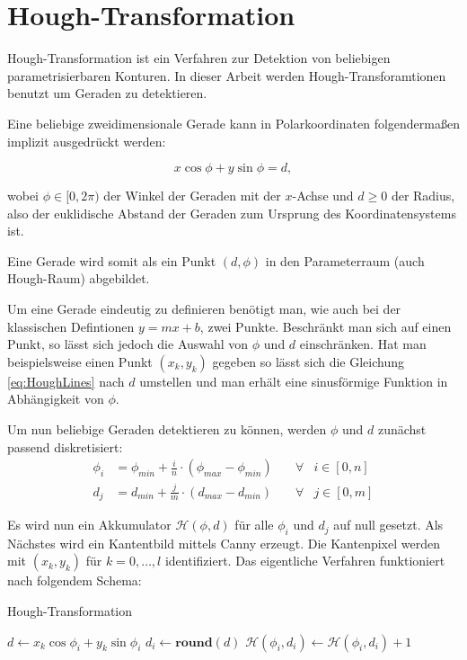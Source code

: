 \section{Hough-Transformation}
\label{s:hough}
Hough-Transformation ist ein Verfahren zur Detektion von beliebigen parametrisierbaren Konturen. In dieser Arbeit werden Hough-Transforamtionen benutzt um Geraden zu detektieren.

Eine beliebige zweidimensionale Gerade kann in Polarkoordinaten folgendermaßen implizit ausgedrückt werden:

\begin{equation}\label{eq:HoughLines}
x\cos\phi + y\sin\phi = d,
\end{equation}

wobei $\phi \in [0,2\pi)$ der Winkel der Geraden mit der $x$-Achse und $d \geq 0$ der Radius, also der euklidische Abstand der Geraden zum Ursprung des Koordinatensystems ist.

Eine Gerade wird somit als ein Punkt $(d,\phi)$ in den Parameterraum (auch Hough-Raum) abgebildet.

Um eine Gerade eindeutig zu definieren benötigt man, wie auch bei der klassischen Defintionen $y = mx + b$, zwei Punkte. Beschränkt man sich auf einen Punkt, so lässt sich jedoch die Auswahl von $\phi$ und $d$ einschränken. Hat man beispielsweise einen Punkt $(x_k,y_k)$ gegeben so lässt sich die Gleichung \ref{eq:HoughLines} nach $d$ umstellen und man erhält eine sinusförmige Funktion in Abhängigkeit von $\phi$.

Um nun beliebige Geraden detektieren zu können, werden $\phi$ und $d$ zunächst passend diskretisiert:
\[
	\begin{aligned}
		\phi_i &= \phi_{min} + \frac{i}{n} \cdot (\phi_{max} - \phi_{min}) \quad&\forall &i\in [0,n]\\
		d_j &= d_{min} + \frac{j}{m} \cdot  (d_{max} - d_{min}) &\forall &j\in [0,m]
	\end{aligned}
\]



Es wird nun ein Akkumulator $\mathcal{H}(\phi, d)$ für alle $\phi_i$ und $d_j$ auf null gesetzt.
Als Nächstes wird ein Kantentbild mittels Canny \cite{Canny1986} erzeugt. Die Kantenpixel werden mit $(x_k,y_k)$ für $k = 0,\dotsc,l$ identifiziert. Das eigentliche Verfahren funktioniert nach folgendem Schema:

\begin{algorithm}
	\caption{Hough-Transformation}\label{euclid}
	\begin{algorithmic}[1]
		 
		 
		\State $d \gets x_k\cos\phi_i + y_k\sin\phi_i$
		\State $d_i \gets \textbf{round}(d)$ 
		\State  $\mathcal{H}(\phi_i, d_i) \gets \mathcal{H}(\phi_i, d_i) + 1$
		\EndFor
		\EndFor
	\end{algorithmic}
\end{algorithm}

